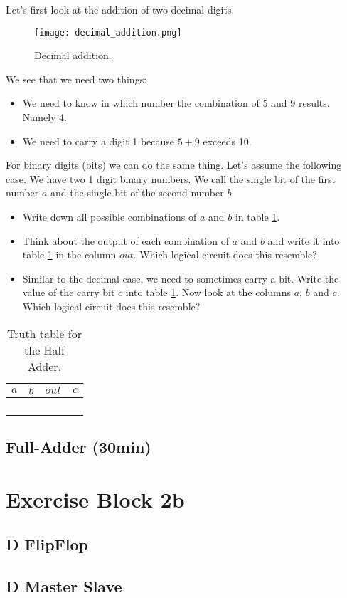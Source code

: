 Let's first look at the addition of two decimal digits. 

\begin{figure}[h]
	\centering		  
	\texttt{[image: decimal\_addition.png]}
	\caption{Decimal addition.}
	\label{fig:decimal_addition}
\end{figure}
We see that we need two things:
\begin{itemize}
	\item We need to know in which number the combination of 5 and 9 results. Namely 4.
	\item We need to carry a digit 1 because $5+9$ exceeds 10.
\end{itemize}

For binary digits (bits) we can do the same thing. Let's assume the following case. We have two 1 digit binary numbers. We call the single bit of the first number $a$ and the single bit of the second number $b$.
\begin{itemize}
	\item Write down all possible combinations of $a$ and $b$ in table \ref{tab:half-adder-truth-table}.
	\item Think about the output of each combination of $a$ and $b$ and write it into table \ref{tab:half-adder-truth-table} in the column $out$. Which logical circuit does this resemble?
	\item Similar to the decimal case, we need to sometimes carry a bit. Write the value of the carry bit $c$ into table \ref{tab:half-adder-truth-table}. Now look at the columns $a$, $b$ and $c$. Which logical circuit does this resemble?
	
\end{itemize}
\begin{table}[H]
	\centering
	\begin{tabular}{|c|c||c|c|}
		\hline
		$a$ & $b$ & $out$   & $c$ \\ \hline
		&     &           &       \\ \hline
		&     &           &       \\ \hline
		&     &           &       \\ \hline
		&     &           &       \\ \hline
	\end{tabular}
	\caption{Truth table for the Half Adder.}
	\label{tab:half-adder-truth-table}
\end{table}

\subsection{Full-Adder (30min)}

\section{Exercise Block 2b}
\subsection{D FlipFlop}
\subsection{D Master Slave}

\newpage